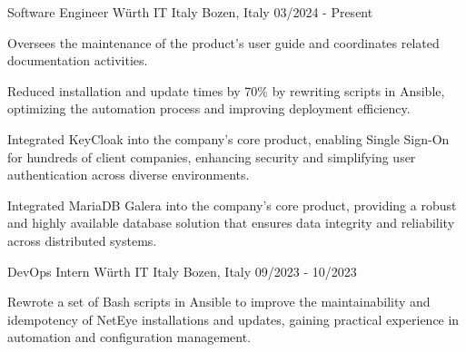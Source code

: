 
\begin{cventries}

	\cventry
	{Software Engineer} %
	{Würth IT Italy} %
	{Bozen, Italy} %
	{03/2024 - Present} %
	{
		\begin{cvitems}
            \item Oversees the maintenance of the product’s user guide and coordinates related documentation activities.
			\item Reduced installation and update times by 70\% by rewriting scripts in Ansible, optimizing the automation process and improving deployment efficiency.
			\item Integrated KeyCloak into the company's core product, enabling Single Sign-On for hundreds of client companies, enhancing security and simplifying user authentication across diverse environments.
			\item Integrated MariaDB Galera into the company's core product, providing a robust and highly available database solution that ensures data integrity and reliability across distributed systems.
		\end{cvitems}
	} %


	\cventry
	{DevOps Intern} %
	{Würth IT Italy} %
	{Bozen, Italy} %
	{09/2023 - 10/2023} %
	{
        \begin{cvitems}
		\item Rewrote a set of Bash scripts in Ansible to improve the maintainability and idempotency of NetEye installations and updates, gaining practical experience in automation and configuration management.
        \end{cvitems}
    } %

\end{cventries}
